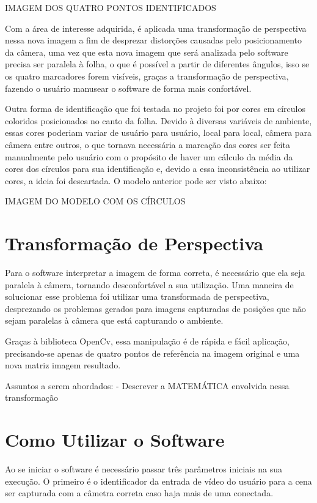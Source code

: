 \documentclass[12pt]{report}
\begin{document}
IMAGEM DOS QUATRO PONTOS IDENTIFICADOS

Com a área de interesse adquirida, é aplicada uma transformação de perspectiva nessa nova imagem a fim de  desprezar distorções causadas pelo posicionamento da câmera, uma vez que esta nova imagem que será analizada pelo software precisa ser paralela à folha, o que é possível a partir de diferentes ângulos, isso se os quatro marcadores forem visíveis, graças a transformação de perspectiva, fazendo o usuário manusear o software de forma mais confortável.

Outra forma de identificação que foi testada no projeto foi por cores em círculos coloridos posicionados no canto da folha. Devido à diversas variáveis de ambiente, essas cores poderiam variar de usuário para usuário, local para local, câmera para câmera entre outros, o que tornava necessária a marcação das cores ser feita manualmente pelo usuário com o propósito de haver um cálculo da média da cores dos círculos para sua identificação e, devido a essa inconsistência ao utilizar cores, a ideia foi descartada. O modelo anterior pode ser visto abaixo:

IMAGEM DO MODELO COM OS CÍRCULOS


\chapter{Transformação de Perspectiva}
\label{cha:fund-teor}

Para o software interpretar a imagem de forma correta, é necessário que ela seja paralela à câmera, tornando desconfortável a sua utilização. Uma maneira de solucionar esse problema foi utilizar uma transformada de perspectiva, desprezando os problemas gerados para imagens capturadas de posições que não sejam paralelas à câmera que está capturando o ambiente.

Graças à biblioteca OpenCv, essa manipulação é de rápida e fácil aplicação, precisando-se apenas de quatro pontos de referência na imagem original e uma nova matriz imagem resultado.



Assuntos a serem abordados:
- Descrever a MATEMÁTICA envolvida nessa transformação 

\chapter{Como Utilizar o Software}
\label{cha:fund-teor}

Ao se iniciar o software é necessário passar três parâmetros iniciais na sua execução. O primeiro é o identificador da entrada de vídeo do usuário para a cena ser capturada com a câmetra correta caso haja mais de uma conectada.
\end{document}
